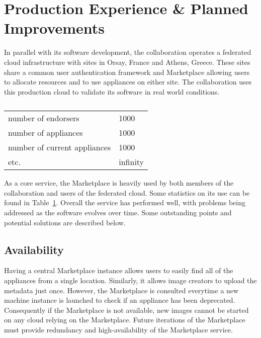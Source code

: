 \section{Production Experience \& Planned Improvements}
\label{sec:production}

In parallel with its software development, the collaboration operates
a federated cloud infrastructure with sites in Orsay, France and
Athens, Greece\@.  These sites share a common user authentication
framework and Marketplace allowing users to allocate resources and to
use appliances on either site.  The collaboration uses this production
cloud to validate its software in real world conditions.

\begin{table}
\caption{}
\label{tab:statistics}
\begin{center}
\begin{tabular}{ll}
\hline
number of endorsers & 1000 \\
number of appliances & 1000 \\
number of current appliances & 1000 \\
etc. & infinity \\
\hline
\end{tabular}
\end{center}
\end{table}

As a core service, the Marketplace is heavily used by both members of
the collaboration and users of the federated cloud.  Some statistics
on its use can be found in Table~\ref{tab:statistics}.  Overall the
service has performed well, with problems being addressed as the
software evolves over time.  Some outstanding points and potential
solutions are described below.

\subsection{Availability}

Having a central Marketplace instance allows users to easily find all
of the appliances from a single location.  Similarly, it allows image
creators to upload the metadata just once.  However, the Marketplace
is consulted everytime a new machine instance is launched to check if
an appliance has been deprecated.  Consequently if the Marketplace is
not available, new images cannot be started on any cloud relying on
the Marketplace\@.  Future iterations of the Marketplace must provide
redundancy and high-availability of the Marketplace service. 

